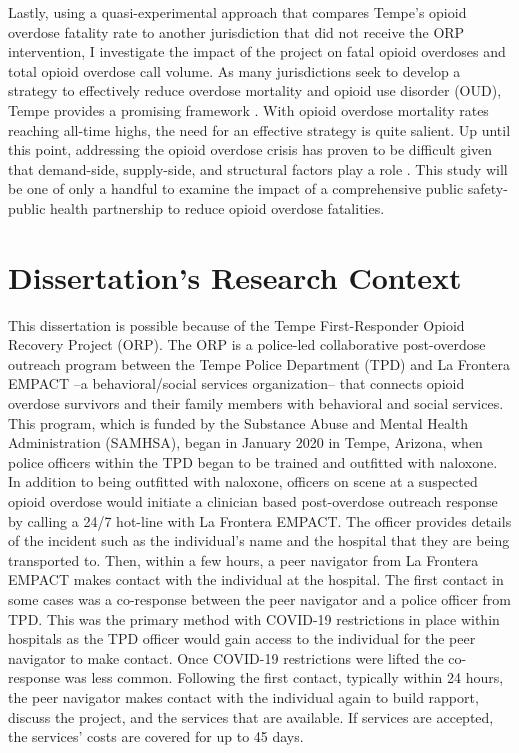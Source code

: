 Lastly, using a quasi-experimental approach that compares Tempe’s opioid overdose fatality rate to another jurisdiction that did not receive the ORP intervention, I investigate the impact of the project on fatal opioid overdoses and total opioid overdose call volume. As many jurisdictions seek to develop a strategy to effectively reduce overdose mortality and opioid use disorder (OUD), Tempe provides a promising framework \parencite{white_moving_2021}. With opioid overdose mortality rates reaching all-time highs, the need for an effective strategy is quite salient. Up until this point, addressing the opioid overdose crisis has proven to be difficult given that demand-side, supply-side, and structural factors play a role \parencite{feldmeyer_community_2022}. This study will be one of only a handful to examine the impact of a comprehensive public safety-public health partnership to reduce opioid overdose fatalities.

\section{Dissertation's Research Context}

This dissertation is possible because of the Tempe First-Responder Opioid Recovery Project (ORP). The ORP is a police-led collaborative post-overdose outreach program between the Tempe Police Department (TPD) and La Frontera EMPACT --a behavioral/social services organization-- that connects opioid overdose survivors and their family members with behavioral and social services. This program, which is funded by the Substance Abuse and Mental Health Administration (SAMHSA), began in January 2020 in Tempe, Arizona, when police officers within the TPD began to be trained and outfitted with naloxone. In addition to being outfitted with naloxone, officers on scene at a suspected opioid overdose would initiate a clinician based post-overdose outreach response by calling a 24/7 hot-line with La Frontera EMPACT. The officer provides details of the incident such as the individual's name and the hospital that they are being transported to. Then, within a few hours, a peer navigator from La Frontera EMPACT makes contact with the individual at the hospital. The first contact in some cases was a co-response between the peer navigator and a police officer from TPD. This was the primary method with COVID-19 restrictions in place within hospitals as the TPD officer would gain access to the individual for the peer navigator to make contact. Once COVID-19 restrictions were lifted the co-response was less common. Following the first contact, typically within 24 hours, the peer navigator makes contact with the individual again to build rapport, discuss the project, and the services that are available. If services are accepted, the services' costs are covered for up to 45 days. 

